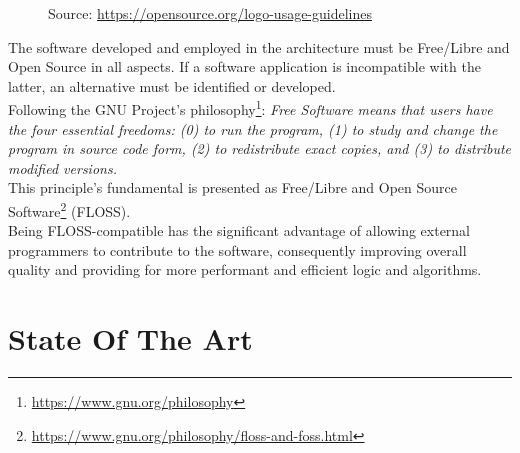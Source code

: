 \begin{figure} %
  \centering
  \def\stackalignment{r} %
  {\scriptsize \parbox[t]{\linewidth}{ Source: \url{https://opensource.org/logo-usage-guidelines}} }
\end{figure}

The software developed and employed in the architecture must be Free/Libre and Open
Source in all aspects. If a software application is incompatible with the latter,
an alternative must be identified or developed. \\ %
Following the GNU Project's philosophy\footnote{\url{https://www.gnu.org/philosophy}}:
\textit{Free Software means that users have the four essential freedoms: (0) to run
the program, (1) to study and change the program in source code form, (2) to redistribute
exact copies, and (3) to distribute modified versions.} \\ %
This principle's fundamental is presented as Free/Libre and Open Source Software\footnote{\url{https://www.gnu.org/philosophy/floss-and-foss.html}}
(FLOSS). \\ %
Being FLOSS-compatible has the significant advantage of allowing external programmers
to contribute to the software, consequently improving overall quality and
providing for more performant and efficient logic and algorithms.

\section{State Of The Art}
\label{sec:introduction_state_of_the_art}


